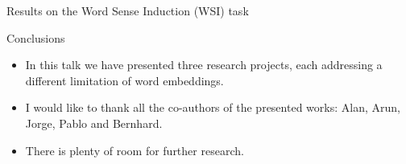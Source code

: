 \documentclass[handout]{beamer}
\begin{document}
\begin{frame}{Results on the Word Sense Induction (WSI) task}
\begin{scriptsize}
\begin{table}
    \centering
    \caption{Comparison of sense embedding models and WSI-specific techniques on the SemEval 2010 and 2013 WSI tasks. SE-WSI-fix-cmp is based on MSSG model. $^\dagger$ - models which obtain explicit sense embeddings.}
    \label{tab:wsi}
\end{table}
\end{scriptsize}
\end{frame}


\begin{frame}{Conclusions}

\begin{itemize}
\item In this talk we have presented three research projects, each addressing a different limitation of word embeddings.


\item I would like to thank all the co-authors of the presented works: Alan, Arun, Jorge, Pablo and Bernhard.

\item There is plenty of room for further research.
\end{itemize}


\end{frame}
\end{document}

